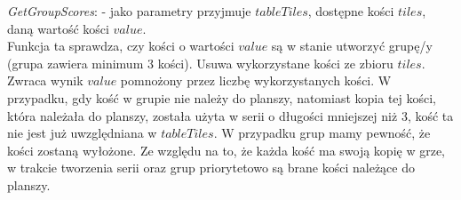 \emph{GetGroupScores}: - jako parametry przyjmuje $tableTiles$, dostępne kości $tiles$, daną wartość kości $value$.  \\
Funkcja ta sprawdza, czy kości o wartości $value$ są w stanie utworzyć grupę/y (grupa zawiera minimum $3$ kości). Usuwa wykorzystane kości ze zbioru $tiles$. Zwraca wynik $value$ pomnożony przez liczbę wykorzystanych kości. W przypadku, gdy kość w grupie nie należy do planszy, natomiast kopia tej kości, która należała do planszy, została użyta w serii o długości mniejszej niż $3$, kość ta nie jest już uwzględniana w $tableTiles$. W przypadku grup mamy pewność, że kości zostaną wyłożone. Ze względu na to, że każda kość ma swoją kopię w grze, w trakcie tworzenia serii oraz grup priorytetowo są brane kości należące do planszy. \\




